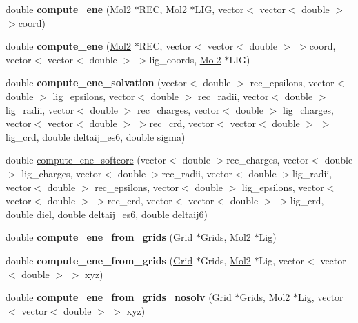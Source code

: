 \begin{DoxyCompactItemize}
\item 
\hypertarget{classENERGY_a9b3a32737323c78562c690da4919c0eb}{
double {\bfseries compute\_\-ene} (\hyperlink{classMol2}{Mol2} $\ast$REC, \hyperlink{classMol2}{Mol2} $\ast$LIG, vector$<$ vector$<$ double $>$ $>$coord)}
\label{classENERGY_a9b3a32737323c78562c690da4919c0eb}

\item 
\hypertarget{classENERGY_a9cb9598c31546dea5965933b5f7375d6}{
double {\bfseries compute\_\-ene} (\hyperlink{classMol2}{Mol2} $\ast$REC, vector$<$ vector$<$ double $>$ $>$coord, vector$<$ vector$<$ double $>$ $>$lig\_\-coords, \hyperlink{classMol2}{Mol2} $\ast$LIG)}
\label{classENERGY_a9cb9598c31546dea5965933b5f7375d6}

\item 
\hypertarget{classENERGY_a12ca9457a3dae5359f70dd74f41bb691}{
double {\bfseries compute\_\-ene\_\-solvation} (vector$<$ double $>$ rec\_\-epsilons, vector$<$ double $>$ lig\_\-epsilons, vector$<$ double $>$ rec\_\-radii, vector$<$ double $>$ lig\_\-radii, vector$<$ double $>$ rec\_\-charges, vector$<$ double $>$ lig\_\-charges, vector$<$ vector$<$ double $>$ $>$rec\_\-crd, vector$<$ vector$<$ double $>$ $>$lig\_\-crd, double deltaij\_\-es6, double sigma)}
\label{classENERGY_a12ca9457a3dae5359f70dd74f41bb691}

\item 
double \hyperlink{classENERGY_ad01bf537f4d415c8f3851c752b76cdcb}{compute\_\-ene\_\-softcore} (vector$<$ double $>$rec\_\-charges, vector$<$ double $>$ lig\_\-charges, vector$<$ double $>$rec\_\-radii, vector$<$ double $>$lig\_\-radii, vector$<$ double $>$ rec\_\-epsilons, vector$<$ double $>$ lig\_\-epsilons, vector$<$ vector$<$ double $>$ $>$rec\_\-crd, vector$<$ vector$<$ double $>$ $>$lig\_\-crd, double diel, double deltaij\_\-es6, double deltaij6)
\item 
\hypertarget{classENERGY_a2a1521dbb9ea6f6df1a655837d549f92}{
double {\bfseries compute\_\-ene\_\-from\_\-grids} (\hyperlink{classGrid}{Grid} $\ast$Grids, \hyperlink{classMol2}{Mol2} $\ast$Lig)}
\label{classENERGY_a2a1521dbb9ea6f6df1a655837d549f92}

\item 
\hypertarget{classENERGY_a0f61a662e8b538d0e910b9b7c82b07e0}{
double {\bfseries compute\_\-ene\_\-from\_\-grids} (\hyperlink{classGrid}{Grid} $\ast$Grids, \hyperlink{classMol2}{Mol2} $\ast$Lig, vector$<$ vector$<$ double $>$ $>$ xyz)}
\label{classENERGY_a0f61a662e8b538d0e910b9b7c82b07e0}

\item 
\hypertarget{classENERGY_a805d6694a178459221ee5fd6b96af562}{
double {\bfseries compute\_\-ene\_\-from\_\-grids\_\-nosolv} (\hyperlink{classGrid}{Grid} $\ast$Grids, \hyperlink{classMol2}{Mol2} $\ast$Lig, vector$<$ vector$<$ double $>$ $>$ xyz)}
\label{classENERGY_a805d6694a178459221ee5fd6b96af562}


\end{DoxyCompactItemize}
